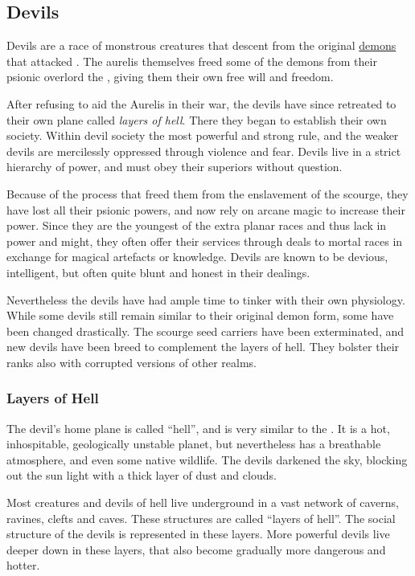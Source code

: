\subsection{Devils}
\label{sec:Devils}

Devils are a race of monstrous creatures that descent from the original
\hyperref[sec:Demons]{demons} that attacked . The aurelis
themselves freed some of the demons from their psionic overlord the
, giving them their own free will and freedom.

After refusing to aid the Aurelis in their war, the devils have since
retreated to their own plane called \emph{layers of hell}. There they began to
establish their own society. Within devil society the most powerful and strong
rule, and the weaker devils are mercilessly oppressed through violence and
fear. Devils live in a strict hierarchy of power, and must obey their
superiors without question.

Because of the process that freed them from the enslavement of the scourge,
they have lost all their psionic powers, and now rely on arcane magic to
increase their power. Since they are the youngest of the extra planar races
and thus lack in power and might, they often offer their services through
deals to mortal races in exchange for magical artefacts or knowledge. Devils
are known to be devious, intelligent, but often quite blunt and honest in
their dealings.

Nevertheless the devils have had ample time to tinker with their own
physiology. While some devils still remain similar to their original demon
form, some have been changed drastically. The scourge seed carriers have been
exterminated, and new devils have been breed to complement the layers of hell.
They bolster their ranks also with corrupted versions of other realms.

\subsubsection{Layers of Hell}
\label{sec:Layers of Hell}

The devil's home plane is called ``hell'', and is very similar to the
. It is a hot, inhospitable, geologically unstable planet,
but nevertheless has a breathable atmosphere, and even some native
wildlife. The devils darkened the sky, blocking out the sun light with a thick
layer of dust and clouds.

Most creatures and devils of hell live underground in a vast network of
caverns, ravines, clefts and caves. These structures are called ``layers of
hell''. The social structure of the devils is represented in these layers.
More powerful devils live deeper down in these layers, that also become
gradually more dangerous and hotter.


